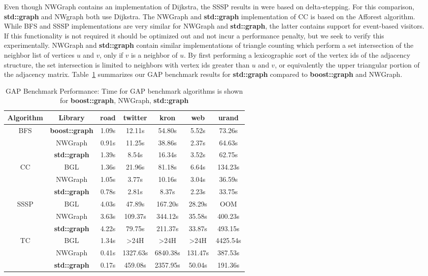 Even though NWGraph contains an implementation of Dijkstra, the SSSP results in \cite{REF_nwgraph_library}
were based on delta-stepping. For this comparison, \textbf{std::graph} and NWgraph both use Dijkstra.
The NWGraph and \textbf{std::graph} implementation of CC is based on the Afforest \cite{sutton2018optimizing} algorithm.
While BFS and SSSP implementations are very similar for NWGraph and \textbf{std::graph}, the latter contains
support for event-based visitors.
If this functionality is not required it should be optimized out and not
incur a performance penalty,
but we seek to verify this experimentally.
NWGraph and \textbf{std::graph} contain similar implementations of triangle
counting which perform a set intersection of the neighbor list of vertices
$u$ and $v$, only if $v$ is a neighbor of $u$.
By first performing a lexicographic sort of the vertex ids of the adjacency
structure, the set intersection is limited to neighbors with vertex ids greater
than $u$ and $v$, or equivalently the upper triangular portion of the adjacency
matrix.
Table~\ref{tab:performance_numbers} summarizes our GAP benchmark results for \textbf{std::graph} compared to \textbf{boost::graph} and NWGraph.

\begin{table}[h!]
\centering
\begin{tabular}{ c c c c c c c }
Algorithm & Library & road & twitter & kron & web & urand \\
\hline
\multirow{3}{*}{BFS} & \textbf{boost::graph} & 1.09s & 12.11s & 54.80s & 5.52s & 73.26s \\
& NWGraph & 0.91s & 11.25s & 38.86s & 2.37s & 64.63s \\
& \textbf{std::graph} & 1.39s & 8.54s & 16.34s & 3.52s & 62.75s \\
\hline
\multirow{3}{*}{CC} & BGL & 1.36s & 21.96s & 81.18s & 6.64s & 134.23s \\
& NWGraph & 1.05s & 3.77s & 10.16s & 3.04s & 36.59s \\
& \textbf{std::graph} & 0.78s & 2.81s & 8.37s & 2.23s & 33.75s \\
\hline
\multirow{3}{*}{SSSP} & BGL & 4.03s & 47.89s & 167.20s & 28.29s & OOM \\
& NWGraph & 3.63s & 109.37s & 344.12s & 35.58s & 400.23s \\
& \textbf{std::graph} & 4.22s & 79.75s & 211.37s & 33.87s & 493.15s \\
\hline
\multirow{3}{*}{TC} & BGL & 1.34s & >24H & >24H & >24H & 4425.54s \\
& NWGraph & 0.41s & 1327.63s & 6840.38s & 131.47s & 387.53s \\
& \textbf{std::graph} & 0.17s & 459.08s & 2357.95s & 50.04s & 191.36s \\
\hline
\end{tabular}
\caption{GAP Benchmark Performance: Time for GAP benchmark algorithms is shown for \textbf{boost::graph}, NWGraph, \textbf{std::graph}}
\label{tab:performance_numbers}
\end{table}

